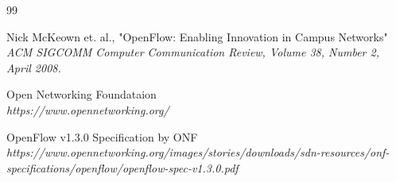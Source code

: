\documentclass[a4paper]{article}
\begin{document}
\begin{thebibliography} {99}

Nick McKeown et. al.,
"OpenFlow: Enabling Innovation in Campus Networks"\\
{\em ACM SIGCOMM Computer Communication Review, Volume 38, Number 2, April 2008.}

Open Networking Foundataion \\
{\em https://www.opennetworking.org/}

OpenFlow v1.3.0 Specification by ONF \\
{\em https://www.opennetworking.org/images/stories/downloads/sdn-resources/onf-specifications/openflow/openflow-spec-v1.3.0.pdf}

\end{thebibliography}
\end{document}
